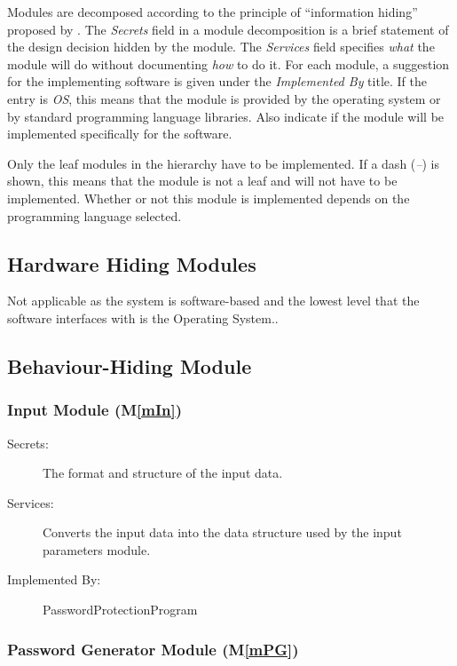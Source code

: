 \documentclass[12pt, titlepage]{article}
\newcommand{\mref}[1]{M\ref{#1}}
\begin{document}
Modules are decomposed according to the principle of ``information hiding''
proposed by \citet{ParnasEtAl1984}. The \emph{Secrets} field in a module
decomposition is a brief statement of the design decision hidden by the
module. The \emph{Services} field specifies \emph{what} the module will do
without documenting \emph{how} to do it. For each module, a suggestion for the
implementing software is given under the \emph{Implemented By} title. If the
entry is \emph{OS}, this means that the module is provided by the operating
system or by standard programming language libraries.  Also indicate if the
module will be implemented specifically for the software.

Only the leaf modules in the
hierarchy have to be implemented. If a dash (\emph{--}) is shown, this means
that the module is not a leaf and will not have to be implemented. Whether or
not this module is implemented depends on the programming language
selected.

\subsection{Hardware Hiding Modules}

Not applicable as the system is software-based and the lowest level that the software interfaces with is the Operating System..

\subsection{Behaviour-Hiding Module}

\subsubsection{Input Module (\mref{mIn})}

\begin{description}
\item[Secrets:] The format and structure of the input data.
\item[Services:] Converts the input data into the data structure used by the
  input parameters module.
\item[Implemented By:] PasswordProtectionProgram
\end{description}

\subsubsection{Password Generator Module (\mref{mPG})}
\end{document}
